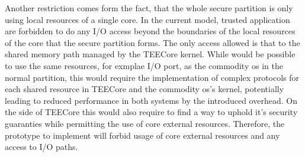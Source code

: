 Another restriction comes form the fact, that the whole secure partition is only
using local resources of a single core. In the current model, trusted
application are forbidden to do any I/O access beyond the boundaries of the
local resources of the core that the secure partition forms. The only access
allowed is that to the shared memory path managed by the TEECore kernel. While
would be possible to use the same resources, for exmplae I/O port, as the
commodity \gls{os} in the normal partition, this would require the
implementation of complex protocols for each shared resource in TEECore and the
commodity \gls{os}'s kernel, potentially leading to reduced performance in both
systems by the introduced overhead. On the side of TEECore this would also
require to find a way to uphold it's security guaranties while permitting the
use of core external resources. Therefore, the prototype to implement will
forbid usage of core external resources and any access to I/O paths.

